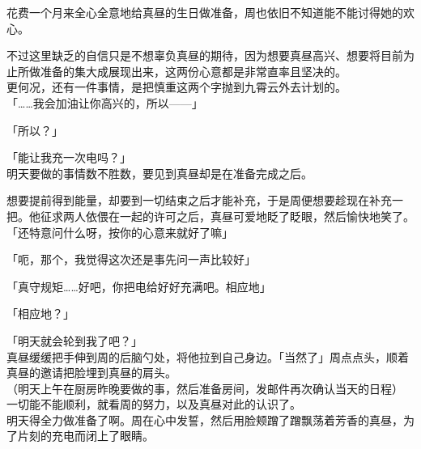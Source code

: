 花费一个月来全心全意地给真昼的生日做准备，周也依旧不知道能不能讨得她的欢心。

不过这里缺乏的自信只是不想辜负真昼的期待，因为想要真昼高兴、想要将目前为止所做准备的集大成展现出来，这两份心意都是非常直率且坚决的。\\

更何况，还有一件事情，是把慎重这两个字抛到九霄云外去计划的。\\

「……我会加油让你高兴的，所以——」

「所以？」

「能让我充一次电吗？」\\

明天要做的事情数不胜数，要见到真昼却是在准备完成之后。

想要提前得到能量，却要到一切结束之后才能补充，于是周便想要趁现在补充一把。他征求两人依偎在一起的许可之后，真昼可爱地眨了眨眼，然后愉快地笑了。\\

「还特意问什么呀，按你的心意来就好了嘛」

「呃，那个，我觉得这次还是事先问一声比较好」

「真守规矩……好吧，你把电给好好充满吧。相应地」

「相应地？」

「明天就会轮到我了吧？」\\

真昼缓缓把手伸到周的后脑勺处，将他拉到自己身边。「当然了」周点点头，顺着真昼的邀请把脸埋到真昼的肩头。\\

（明天上午在厨房昨晚要做的事，然后准备房间，发邮件再次确认当天的日程）\\

一切能不能顺利，就看周的努力，以及真昼对此的认识了。\\

明天得全力做准备了啊。周在心中发誓，然后用脸颊蹭了蹭飘荡着芳香的真昼，为了片刻的充电而闭上了眼睛。

